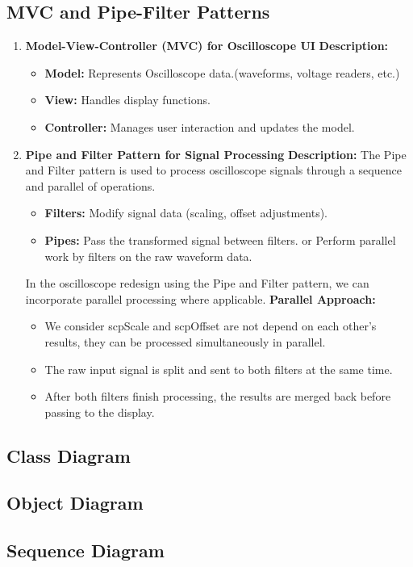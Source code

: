 \subsection{MVC and Pipe-Filter Patterns}
\begin{enumerate}
  \item  \textbf{Model-View-Controller (MVC) for Oscilloscope UI}
  \newline \textbf{Description:}
    \begin{itemize}
        \item  \textbf{Model:}
        \newline Represents Oscilloscope data.(waveforms, voltage readers, etc.)
        \item \textbf{View:}
        \newline Handles display functions.
        \item \textbf{Controller:}
        \newline Manages user interaction and updates the model.
    \end{itemize}
  \item \textbf{Pipe and Filter Pattern for Signal Processing}
  \newline \textbf{Description:}
  \newline The Pipe and Filter pattern is used to process oscilloscope signals through a sequence and parallel of operations.
  \begin{itemize}
      \item \textbf{Filters:}
      \newline Modify signal data (scaling, offset adjustments).
      \item \textbf{Pipes:}
      \newline Pass the transformed signal between filters. or Perform parallel work by filters on the raw waveform data.
  \end{itemize}
  In the oscilloscope redesign using the Pipe and Filter pattern, we can incorporate parallel processing where applicable.
  \newline \textbf{Parallel Approach:}
  \begin{itemize}
      \item We consider scpScale and scpOffset are not depend on each other's results, they can be processed simultaneously in parallel.
      \item The raw input signal is split and sent to both filters at the same time.
      \item After both filters finish processing, the results are merged back before passing to the display.
  \end{itemize}
\end{enumerate}

\subsection{Class Diagram}
\subsection{Object Diagram}
\subsection{Sequence Diagram}